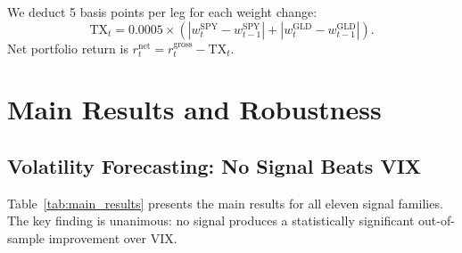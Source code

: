 \documentclass[12pt,a4paper]{article}
\begin{document}
We deduct 5 basis points per leg for each weight change:
\begin{equation}
\text{TX}_t = 0.0005 \times \left(|w_t^{\text{SPY}} - w_{t-1}^{\text{SPY}}| + |w_t^{\text{GLD}} - w_{t-1}^{\text{GLD}}|\right).
\label{eq:tx}
\end{equation}
Net portfolio return is $r_t^{\text{net}} = r_t^{\text{gross}} - \text{TX}_t$.


\section{Main Results and Robustness}
\label{sec:results}

\subsection{Volatility Forecasting: No Signal Beats VIX}

Table~\ref{tab:main_results} presents the main results for all eleven signal families. The key finding is unanimous: no signal produces a statistically significant out-of-sample improvement over VIX.
\end{document}
